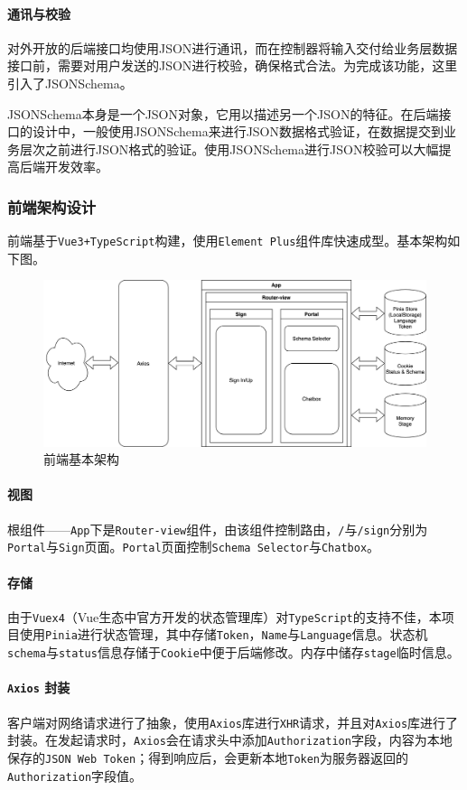 \documentclass[hyperref]{ctexart}
\begin{document}
\paragraph{通讯与校验}
对外开放的后端接口均使用JSON进行通讯，而在控制器将输入交付给业务层数据接口前，需要对用户发送的JSON进行校验，确保格式合法。为完成该功能，这里引入了JSONSchema。
\par JSONSchema本身是一个JSON对象，它用以描述另一个JSON的特征。在后端接口的设计中，一般使用JSONSchema来进行JSON数据格式验证，在数据提交到业务层次之前进行JSON格式的验证。使用JSONSchema进行JSON校验可以大幅提高后端开发效率。
\subsubsection{前端架构设计}
前端基于\texttt{Vue3+TypeScript}构建，使用\texttt{Element Plus}组件库快速成型。基本架构如下图。
\begin{figure}[H]
    \centering
    \includegraphics[scale=0.13]{figure/5.png}
    \caption{前端基本架构}
    \label{Fig.1.5}
\end{figure}
\paragraph{视图} 根组件——\texttt{App}下是\texttt{Router-view}组件，由该组件控制路由，\texttt{/}与\texttt{/sign}分别为\texttt{Portal}与\texttt{Sign}页面。\texttt{Portal}页面控制\texttt{Schema Selector}与\texttt{Chatbox}。
\paragraph{存储} 由于\texttt{Vuex4}（Vue生态中官方开发的状态管理库）对\texttt{TypeScript}的支持不佳，本项目使用\texttt{Pinia}进行状态管理，其中存储\texttt{Token}，\texttt{Name}与\texttt{Language}信息。状态机\texttt{schema}与\texttt{status}信息存储于\texttt{Cookie}中便于后端修改。内存中储存\texttt{stage}临时信息。
\paragraph{\texttt{Axios} 封装} 客户端对网络请求进行了抽象，使用\texttt{Axios}库进行\texttt{XHR}请求，并且对\texttt{Axios}库进行了封装。在发起请求时，\texttt{Axios}会在请求头中添加\texttt{Authorization}字段，内容为本地保存的\texttt{JSON Web Token}；得到响应后，会更新本地\texttt{Token}为服务器返回的\texttt{Authorization}字段值。
\end{document}

